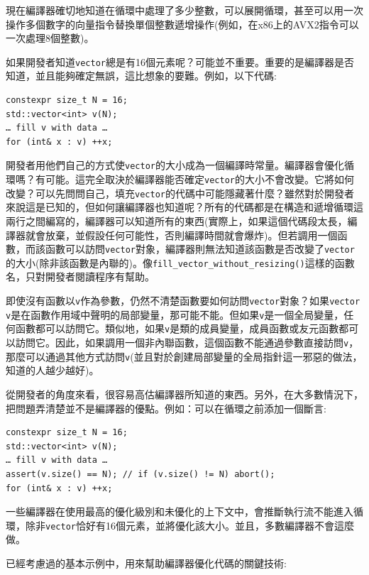 現在編譯器確切地知道在循環中處理了多少整數，可以展開循環，甚至可以用一次操作多個數字的向量指令替換單個整數遞增操作(例如，在x86上的AVX2指令可以一次處理8個整數)。 

如果開發者知道\texttt{vector}總是有16個元素呢？可能並不重要。重要的是編譯器是否知道，並且能夠確定無誤，這比想象的要難。例如，以下代碼:

\begin{lstlisting}[style=styleCXX]
constexpr size_t N = 16;
std::vector<int> v(N);
… fill v with data … 
for (int& x : v) ++x;
\end{lstlisting}

開發者用他們自己的方式使\texttt{vector}的大小成為一個編譯時常量。編譯器會優化循環嗎？有可能。這完全取決於編譯器能否確定\texttt{vector}的大小不會改變。它將如何改變？可以先問問自己，填充\texttt{vector}的代碼中可能隱藏著什麼？雖然對於開發者來說這是已知的，但如何讓編譯器也知道呢？所有的代碼都是在構造和遞增循環這兩行之間編寫的，編譯器可以知道所有的東西(實際上，如果這個代碼段太長，編譯器就會放棄，並假設任何可能性，否則編譯時間就會爆炸)。但若調用一個函數，而該函數可以訪問\texttt{vector}對象，編譯器則無法知道該函數是否改變了\texttt{vector}的大小(除非該函數是內聯的)。像\texttt{fill\_vector\_without\_resizing()}這樣的函數名，只對開發者閱讀程序有幫助。 

即使沒有函數以\texttt{v}作為參數，仍然不清楚函數要如何訪問\texttt{vector}對象？如果\texttt{vector v}是在函數作用域中聲明的局部變量，那可能不能。但如果\texttt{v}是一個全局變量，任何函數都可以訪問它。類似地，如果\texttt{v}是類的成員變量，成員函數或友元函數都可以訪問它。因此，如果調用一個非內聯函數，這個函數不能通過參數直接訪問\texttt{v}，那麼可以通過其他方式訪問\texttt{v}(並且對於創建局部變量的全局指針這一邪惡的做法，知道的人越少越好)。 

從開發者的角度來看，很容易高估編譯器所知道的東西。另外，在大多數情況下，把問題弄清楚並不是編譯器的優點。例如：可以在循環之前添加一個斷言:

\begin{lstlisting}[style=styleCXX]
constexpr size_t N = 16;
std::vector<int> v(N);
… fill v with data … 
assert(v.size() == N); // if (v.size() != N) abort();
for (int& x : v) ++x;
\end{lstlisting}

一些編譯器在使用最高的優化級別和未優化的上下文中，會推斷執行流不能進入循環，除非\texttt{vector}恰好有16個元素，並將優化該大小。並且，多數編譯器不會這麼做。

已經考慮過的基本示例中，用來幫助編譯器優化代碼的關鍵技術:

